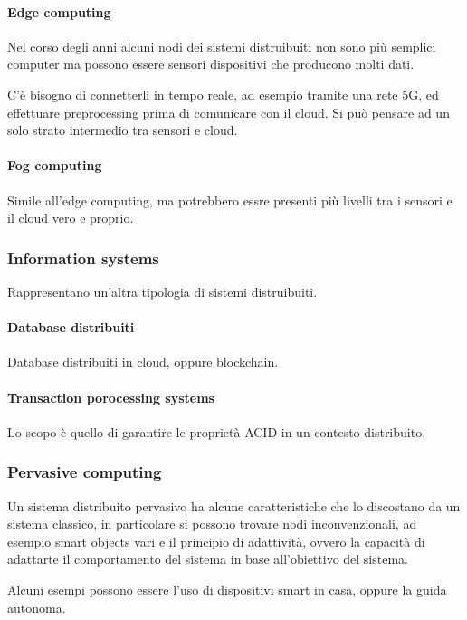 \paragraph{Edge computing}
Nel corso degli anni alcuni nodi dei sistemi distruibuiti non sono più 
semplici computer ma possono essere sensori dispositivi che 
producono molti dati.

C'è bisogno di connetterli in tempo reale, ad esempio tramite una rete 5G, ed effettuare 
preprocessing prima di comunicare con il cloud.
Si può pensare ad un solo strato intermedio tra sensori e cloud.

\paragraph{Fog computing}
Simile all'edge computing, ma potrebbero essre presenti più livelli tra i sensori 
e il cloud vero e proprio.

\subsubsection{Information systems}
Rappresentano un'altra tipologia di sistemi distruibuiti.
\paragraph{Database distribuiti}
Database distribuiti in cloud, oppure blockchain.

\paragraph{Transaction porocessing systems}
Lo scopo è quello di garantire le proprietà ACID in un contesto distribuito.

\subsubsection{Pervasive computing}

Un sistema distribuito pervasivo ha alcune caratteristiche che 
lo discostano da un sistema classico, in particolare si possono trovare 
nodi inconvenzionali, ad esempio smart objects vari e il principio 
di adattività, ovvero la capacità di adattarte il comportamento del sistema
in base all'obiettivo del sistema.

Alcuni esempi possono essere l'uso di dispositivi smart in casa, oppure 
la guida autonoma.

